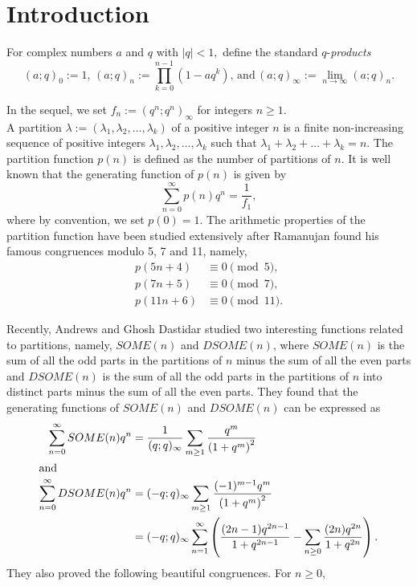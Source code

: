 \documentclass[12pt]{amsart}
\theoremstyle{definition}
\numberwithin{equation}{section}
\begin{document}
\section{Introduction}
For complex numbers $a$ and $q$ with $|q|<1,$ define the standard $q$-\emph{products}
$$(a;q)_{0}:=1,\, (a;q)_{n}:=\displaystyle\prod_{k=0}^{n-1}(1-aq^k),\, \text{and}\, (a;q)_{\infty}:=\lim_{n\to\infty}(a;q)_{n}.$$
\par
In the sequel, we set $f_n:=(q^n;q^n)_{\infty}$ for integers $n\geq1.$\\
A partition $\lambda:=\left(\lambda_1,\lambda_2,\dotsc,\lambda_k\right)$ of a positive integer $n$ is a finite non-increasing sequence of positive integers $\lambda_1,\lambda_2,\dotsc,\lambda_k $
such that $\lambda_1+\lambda_2+\dotsc+\lambda_k=n. $ The partition function $p(n)$ is defined as the number of partitions of $n.$ It is well known that the generating function of $p(n)$ is given by
$$\sum_{n=0}^{\infty}p(n)q^n=\frac{1}{f_1},$$
where by convention, we set $p(0)=1.$ The arithmetic properties of the partition function have been studied extensively after Ramanujan \cite{R5n} found his famous congruences modulo 5, 7 and 11, namely,
\begin{align*}
    p(5n+4)&\equiv 0\pmod{5},\\
     p(7n+5)&\equiv 0\pmod{7},\\
      p(11n+6)&\equiv 0\pmod{11}.
\end{align*}
\par
 Recently, Andrews and Ghosh Dastidar \cite{SOME} studied two interesting functions related to partitions, namely, $SOME(n)$ and $DSOME(n)$, where $SOME(n)$ is the sum of all the odd parts in the partitions of $n$  minus the sum of all the even parts and $DSOME(n)$ is the sum of all the odd parts in the partitions of $n$ into distinct parts minus the sum of all the even parts. They found that the generating functions of $SOME(n)$ and $DSOME(n)$ can be expressed as
 \begin{align} \sum_{n=0}^{\infty}SOME(n)q^n&=\frac{1}{(q;q)_{\infty}}\sum_{m\geq1}\frac{q^m}{\left(1+q^m\right)^2}\notag\\\intertext{and}
\label{DSOMEa}\sum_{n=0}^{\infty}DSOME(n)q^n&=(-q;q)_{\infty}\sum_{m\geq1}\frac{(-1)^{m-1}q^m}{\left(1+q^m\right)^2}\\
&=(-q;q)_{\infty}\sum_{n=1}^{\infty}\left(\frac{(2n-1)q^{2n-1}}{1+q^{2n-1}}-\sum_{n\geq0}\frac{(2n)q^{2n}}{1+q^{2n}}\right).\notag
 \end{align}
 They also proved the following beautiful congruences. For $n\geq0$, 
\end{document}
